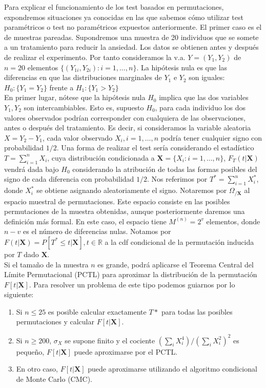 	Para explicar el funcionamiento de los test basados en permutaciones, expondremos situaciones ya conocidas en las que sabemos cómo utilizar test paramétricos o test no paramétricos expuestos anteriormente. El primer caso es el de muestras pareadas. Supondremos una muestra de 20 individuos que se somete a un tratamiento para reducir la ansiedad. Los datos se obtienen antes y después de realizar el experimento. Por tanto consideramos la v.a. $Y = (Y_1, Y_2)$ de $n=20$ elementos $\{(Y_{1i},Y_{2i}): i = 1, \dots, n\}$. La hipótesis nula es que las diferencias en que las distribuciones marginales de $Y_1$ e $Y_2$ son iguales: $H_0 : \{ Y_1 = Y_2 \}$ frente a $H_1: \{ Y_1 > Y_2 \}$\\
	
	En primer lugar, nótese que la hipótesis nula $H_0$ implica que las dos variables $Y_1, Y_2$ son intercambiables. Esto es, supuesto $H_0$, para cada individuo los dos valores observados podrían corresponder con cualquiera de las observaciones, antes o después del tratamiento. Es decir, si consideramos la variable aleatoria $X = Y_2 - Y_1$, cada valor observado $X_i, i=1, \dots, n$ podría tener cualquier signo con probabilidad $1/2$. Una forma de realizar el test sería considerando el estadístico $T = \sum\limits_{i=1}^n X_i$, cuya distribución condicionada a $\mathbf{X} = \{X_i: i = 1, \dots, n\}$, $F_T(t|\mathbf{X})$ vendrá dada bajo $H_0$ considerando la atribución de todas las formas posibles del signo de cada diferencia con probabilidad $1/2$. Nos referimos por $T^* = \sum\limits_{i=1}^n X_i^*$, donde $X_i^*$ se obtiene asignando aleatoriamente el signo. Notaremos por $\Omega_{/\mathbf{X}}$ al espacio muestral de permutaciones. Este espacio consiste en las posibles permutaciones de la muestra obtenidas, aunque posteriormente daremos una definición más formal. En este caso, el espacio tiene $M^{(n)} = 2^v$ elementos, donde $n-v$ es el número de diferencias nulas. Notamos por $F(t|\mathbf{X}) = P[T^* \leq t | \mathbf{X}], t \in \mathbb{R}$ a la cdf condicional de la permutación inducida por $T$ dado $\mathbf{X}$.\\
	Si el tamaño de la muestra $n$ es grande, podrá aplicarse el Teorema Central del Límite Permutacional (PCTL) para aproximar la distribución de la permutación $F[t|\mathbf{X}]$. Para resolver un problema de este tipo podemos guiarnos por lo siguiente:
	
\begin{enumerate}[a]
	\item Si $n \leq 25$ es posible calcular exactamente $T*$ para todas las posibles permutaciones y calcular $F[t|\mathbf{X}]$.
	\item Si $n \geq 200$, $\sigma_X$ se supone finito y el cociente $(\sum_i X_i^4)/(\sum_i X_i^2)^2$ es pequeño, $F[t|\mathbf{X}]$ puede aproximarse por el PCTL. 
	\item En otro caso, $F[t|\mathbf{X}]$ puede aproximarse utilizando el algoritmo condicional de Monte Carlo (CMC).
\end{enumerate}
	
